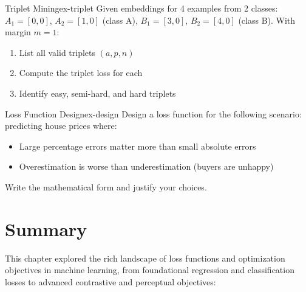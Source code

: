 \documentclass[../../main.tex]{subfiles}
\begin{document}
\begin{exercise}{Triplet Mining}{ex-triplet}
Given embeddings for 4 examples from 2 classes: $A_1 = [0, 0]$, $A_2 = [1, 0]$ (class A), $B_1 = [3, 0]$, $B_2 = [4, 0]$ (class B). With margin $m = 1$:
\begin{enumerate}[label=(\alph*)]
    \item List all valid triplets $(a, p, n)$
    \item Compute the triplet loss for each
    \item Identify easy, semi-hard, and hard triplets
\end{enumerate}
\end{exercise}

\begin{exercise}{Loss Function Design}{ex-design}
Design a loss function for the following scenario: predicting house prices where:
\begin{itemize}
    \item Large percentage errors matter more than small absolute errors
    \item Overestimation is worse than underestimation (buyers are unhappy)
\end{itemize}
Write the mathematical form and justify your choices.
\end{exercise}

\section{Summary}
\label{sec:loss-summary}

This chapter explored the rich landscape of loss functions and optimization objectives in machine learning, from foundational regression and classification losses to advanced contrastive and perceptual objectives:
\end{document}
